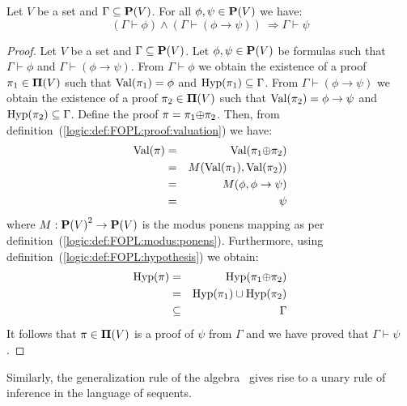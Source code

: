 \begin{prop}\label{logic:prop:FOPL:modus:ponens}
Let $V$ be a set and $\Gamma\subseteq\mbox{${\bf P}(V)$}$. For all $\phi,\psi\in\mbox{${\bf P}(V)$}$
we have:
    \[
    (\Gamma\vdash\phi)\land(\Gamma\vdash (\phi\to\psi))\ \Rightarrow
    \Gamma\vdash\psi
    \]
\end{prop}
\begin{proof}
Let $V$ be a set and $\Gamma\subseteq\mbox{${\bf P}(V)$}$. Let $\phi,\psi\in\mbox{${\bf P}(V)$}$ be
formulas such that $\Gamma\vdash\phi$ and
$\Gamma\vdash(\phi\to\psi)$. From $\Gamma\vdash\phi$ we obtain the
existence of a proof $\pi_{1}\in\mbox{${\bf\Pi}(V)$}$ such that $\mbox{\rm Val}(\pi_{1})=\phi$
and $\mbox{\rm Hyp}(\pi_{1})\subseteq\Gamma$. From $\Gamma\vdash(\phi\to\psi)$
we obtain the existence of a proof $\pi_{2}\in\mbox{${\bf\Pi}(V)$}$ such that
$\mbox{\rm Val}(\pi_{2})= \phi\to\psi$ and $\mbox{\rm Hyp}(\pi_{2})\subseteq\Gamma$.
Define the proof $\pi=\pi_{1}\mbox{$\oplus$}\pi_{2}$. Then, from
definition~(\ref{logic:def:FOPL:proof:valuation}) we have:
    \begin{eqnarray*}
    \mbox{\rm Val}(\pi)&=&\mbox{\rm Val}(\pi_{1}\mbox{$\oplus$}\pi_{2})\\
        &=&M(\mbox{\rm Val}(\pi_{1}),\mbox{\rm Val}(\pi_{2}))\\
        &=&M(\phi,\phi\to\psi)\\
        &=&\psi
    \end{eqnarray*}
where $M:\mbox{${\bf P}(V)$}^{2}\to\mbox{${\bf P}(V)$}$ is the modus ponens mapping as per
definition~(\ref{logic:def:FOPL:modus:ponens}). Furthermore, using
definition~(\ref{logic:def:FOPL:hypothesis}) we obtain:
    \begin{eqnarray*}
    \mbox{\rm Hyp}(\pi)&=&\mbox{\rm Hyp}(\pi_{1}\mbox{$\oplus$}\pi_{2})\\
    &=&\mbox{\rm Hyp}(\pi_{1})\cup\mbox{\rm Hyp}(\pi_{2})\\
    &\subseteq&\Gamma
    \end{eqnarray*}
It follows that $\pi\in\mbox{${\bf\Pi}(V)$}$ is a proof of $\psi$ from $\Gamma$ and
we have proved that $\Gamma\vdash\psi$.
\end{proof}

Similarly, the generalization rule of the algebra \pvs\ gives rise
to a unary rule of inference in the language of sequents.

